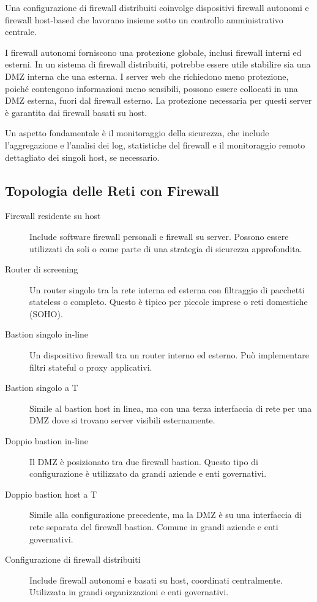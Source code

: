 Una configurazione di firewall distribuiti coinvolge dispositivi firewall autonomi e firewall host-based che lavorano insieme sotto un controllo amministrativo centrale.

I firewall autonomi forniscono una protezione globale, inclusi firewall interni ed esterni. In un sistema di firewall distribuiti, potrebbe essere utile stabilire sia una DMZ interna che una esterna. I server web che richiedono meno protezione, poiché contengono informazioni meno sensibili, possono essere collocati in una DMZ esterna, fuori dal firewall esterno. La protezione necessaria per questi server è garantita dai firewall basati su host.

Un aspetto fondamentale è il monitoraggio della sicurezza, che include l'aggregazione e l'analisi dei log, statistiche del firewall e il monitoraggio remoto dettagliato dei singoli host, se necessario.

\subsection{Topologia delle Reti con Firewall}

\begin{description}
    \item[Firewall residente su host] Include software firewall personali e firewall su server. Possono essere utilizzati da soli o come parte di una strategia di sicurezza approfondita.
    
    \item[Router di screening] Un router singolo tra la rete interna ed esterna con filtraggio di pacchetti stateless o completo. Questo è tipico per piccole imprese o reti domestiche (SOHO).
    
    \item[Bastion singolo in-line] Un dispositivo firewall tra un router interno ed esterno. Può implementare filtri stateful o proxy applicativi.
    
    \item[Bastion singolo a T] Simile al bastion host in linea, ma con una terza interfaccia di rete per una DMZ dove si trovano server visibili esternamente.
    
    \item[Doppio bastion in-line] Il DMZ è posizionato tra due firewall bastion. Questo tipo di configurazione è utilizzato da grandi aziende e enti governativi.
    
    \item[Doppio bastion host a T] Simile alla configurazione precedente, ma la DMZ è su una interfaccia di rete separata del firewall bastion. Comune in grandi aziende e enti governativi.
    
    \item[Configurazione di firewall distribuiti] Include firewall autonomi e basati su host, coordinati centralmente. Utilizzata in grandi organizzazioni e enti governativi.
\end{description}


